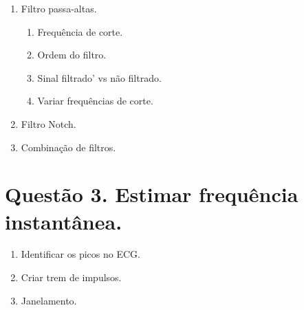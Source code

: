 \documentclass[12pt,letterpaper]{article}
\begin{document}
\begin{enumerate}[label=(\alph*)]
     \item  Filtro passa-altas.
    \begin{enumerate}[label=(b.\arabic*)]
        \item Frequência de corte.
        \item Ordem do filtro.
        \item Sinal filtrado' vs não filtrado.
        \item Variar frequências de corte.
    \end{enumerate}
    \item Filtro Notch.
    \item Combinação de filtros.
\end{enumerate}


\section*{Questão 3. Estimar frequência instantânea.}
\begin{enumerate}[label=(\alph*)]  %
    \item Identificar os picos no ECG.
    \item Criar trem de impulsos.
    \item Janelamento.
\end{enumerate}
\end{document}
